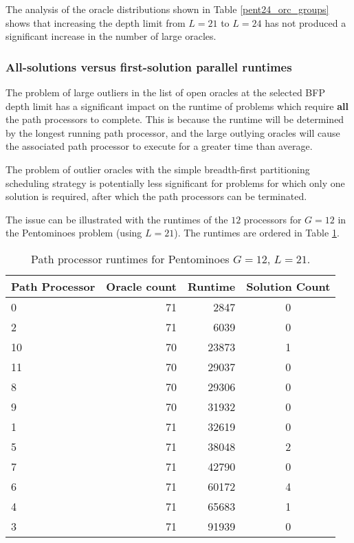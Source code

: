 The analysis of the oracle distributions shown in Table \ref{pent24_orc_groups} shows
that increasing the depth limit from $L=21$ to $L=24$ has not produced a significant
increase in the number of large oracles.

\subsubsection{All-solutions versus first-solution parallel runtimes}

The problem of large outliers in the list of open oracles at the selected BFP depth
limit has a significant impact on the runtime of problems which require \textbf{all} the
path processors to complete.  This is because the runtime will be determined by the
longest running path processor, and the large outlying oracles will cause the associated
path processor to execute for a greater time than average.

The problem of outlier oracles with the simple breadth-first partitioning scheduling
strategy is potentially less significant for problems for which
only one solution is required, after which the path processors can be terminated.

The issue can be illustrated with the runtimes of the $12$ processors for $G=12$ in 
the Pentominoes problem (using $L=21$).  The runtimes are ordered in Table
\ref{pent_12_runtimes}.

\begin{table}[htb]
{\small
\begin{tabular}{| l | r | r | c |}
\hline
\textbf{Path Processor} & \textbf{Oracle count} & \textbf{Runtime} & \textbf{Solution Count} \\
\hline
0  & 71 & 2847  & 0 \\
2  & 71 & 6039  & 0 \\
10 & 70 & 23873 & 1 \\
11 & 70 & 29037 & 0 \\
8  & 70 & 29306 & 0 \\
9  & 70 & 31932 & 0 \\
1  & 71 & 32619 & 0 \\
5  & 71 & 38048 & 2 \\
7  & 71 & 42790 & 0 \\
6  & 71 & 60172 & 4 \\
4  & 71 & 65683 & 1 \\
3  & 71 & 91939 & 0 \\
\hline
\end{tabular}
}
\caption[Pentominoes runtimes for $G=12$, $L=24$]{Path processor runtimes for 
                                                  Pentominoes $G=12$, $L=21$.}
\label{pent_12_runtimes}
\end{table}

